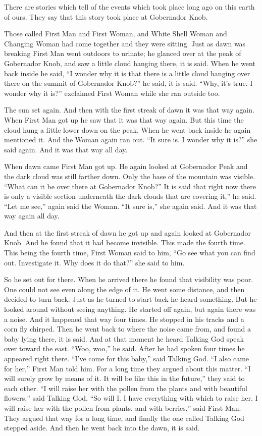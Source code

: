 There are stories which tell of the events which took place long ago on this earth of ours. They say that this story took place at Gobernador Knob.

Those called First Man and First Woman, and White Shell Woman and Changing Woman had come together and they were sitting. Just as dawn was breaking First Man went outdoors to urinate; he glanced over at the peak of Gobernador Knob, and saw a little cloud hanging there, it is said. When he went back inside he said, ``I wonder why it is that there is a little cloud hanging over there on the summit of Gobernador Knob?'' he said, it is said. ``Why, it's true. I wonder why it is?'' exclaimed First Woman while she ran outside too.

The sun set again. And then with the first streak of dawn it was that way again. When First Man got up he saw that it was that way again. But this time the cloud hung a little lower down on the peak. When he went back inside he again mentioned it. And the Woman again ran out. ``It sure is. I wonder why it is?'' she said again. And it was that way all day.

When dawn came First Man got up. He again looked at Gobernador Peak and the dark cloud was still farther down. Only the base of the mountain was visible. ``What can it be over there at Gobernador Knob?'' It is said that right now there is only a visible section underneath the dark clouds that are covering it,'' he said. ``Let me see,'' again said the Woman. ``It sure is,'' she again said. And it was that way again all day.

And then at the first streak of dawn he got up and again looked at Gobernador Knob. And he found that it had become invisible. This made the fourth time. This being the fourth time, First Woman said to him, ``Go see what you can find out. Investigate it. Why does it do that?'' she said to him.

So he set out for there. When he arrived there he found that visibility was poor. One could not see even along the edge of it. He went some distance, and then decided to turn back. Just as he turned to start back he heard something. But he looked around without seeing anything. He started off again, but again there was a noise. And it happened that way four times. He stopped in his tracks and a corn fly chirped. Then he went back to where the noise came from, and found a baby lying there, it is said. And at that moment he heard Talking God speak over toward the east. ``Woo, woo,'' he said. After he had spoken four times he appeared right there. ``I've come for this baby,'' said Talking God. ``I also came for her,'' First Man told him. For a long time they argued about this matter. ``I will surely grow by means of it. It will be like this in the future,'' they said to each other. ``I will raise her with the pollen from the plants and with beautiful flowers,'' said Talking God. ``So will I. I have everything with which to raise her. I will raise her with the pollen from plants, and with berries,'' said First Man. They argued that way for a long time, and finally the one called Talking God stepped aside. And then he went back into the dawn, it is said.

